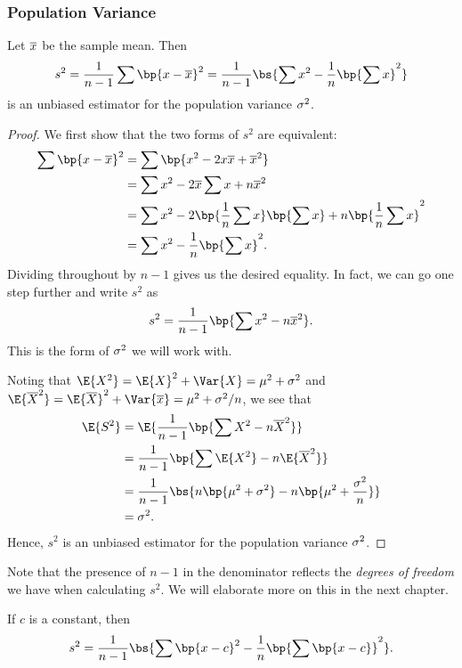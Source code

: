 \subsubsection{Population Variance}

\begin{proposition}
    Let $\overline{x}$ be the sample mean. Then \[s^2 = \frac{1}{n-1} \sum \bp{x - \ol{x}}^2 = \frac1{n-1} \bs{\sum x^2 - \frac1n \bp{\sum x}^2}\] is an unbiased estimator for the population variance $\sigma^2$.
\end{proposition}
\begin{proof}
    We first show that the two forms of $s^2$ are equivalent:
    \begin{align*}
        \sum \bp{x - \ol{x}}^2 &= \sum \bp{x^2 - 2x\ol{x} + \ol{x}^2}\\
        &= \sum x^2 - 2\ol{x} \sum x + n \ol{x}^2\\
        &= \sum x^2 - 2\bp{\frac1n \sum x}\bp{\sum x} + n \bp{\frac1{n} \sum x}^2\\
        &= \sum x^2 - \frac1n \bp{\sum x}^2.
    \end{align*}
    Dividing throughout by $n-1$ gives us the desired equality. In fact, we can go one step further and write $s^2$ as \[s^2 = \frac1{n-1} \bp{\sum x^2 - n \ol{x}^2}.\] This is the form of $\sigma^2$ we will work with.

   Noting that $\E{X^2} = \E{X}^2 + \Var{X} = \m^2 + \s^2$ and  $\E{\ol{X}^2} = \E{\ol{X}}^2 + \Var{\ol{x}} = \m^2 +\s^2/n$, we see that
    \begin{align*}
        \E{S^2} &= \E{\frac1{n-1} \bp{\sum X^2 - n \ol{X}^2}}\\
        &= \frac1{n-1} \bp{\sum \E{X^2} - n \E{\ol{X}^2}}\\
        &= \frac1{n-1} \bs{n \bp{\m^2 + \s^2} - n \bp{\m^2 + \frac{\s^2}{n}}}\\
        &= \s^2.
    \end{align*}
    Hence, $s^2$ is an unbiased estimator for the population variance $\sigma^2$.
\end{proof}

Note that the presence of $n-1$ in the denominator reflects the \emph{degrees of freedom} we have when calculating $s^2$. We will elaborate more on this in the next chapter.

\begin{corollary}
    If $c$ is a constant, then \[s^2 = \frac1{n-1} \bs{\sum \bp{x-c}^2 - \frac1n \bp{\sum \bp{x-c}}^2}.\]
\end{corollary}

